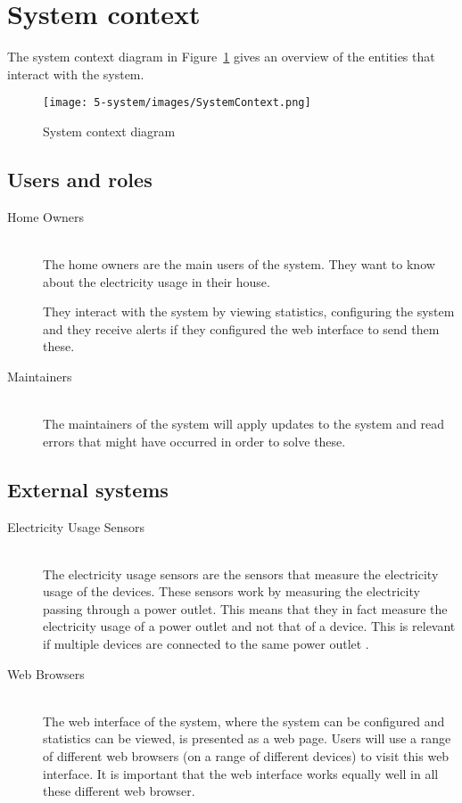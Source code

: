 \section{System context}
\label{sec:system-context}

The system context diagram in Figure~\ref{fig:system-context-diagram} gives an overview of the entities that interact with the system.

\begin{figure}[H]
	\centering
	\texttt{[image: 5-system/images/SystemContext.png]}
	\caption{System context diagram}
	\label{fig:system-context-diagram}
\end{figure}

\subsection{Users and roles}
\begin{description}

	\item[Home Owners] ~\\ The home owners are the main users of the system. They want to know about the electricity usage in their house. 
	
	They interact with the system by viewing statistics, configuring the system and they receive alerts if they configured the web interface to send them these. 
	
	\item[Maintainers] ~\\ The maintainers of the system will apply updates to the system and read errors that might have occurred in order to solve these.
	
\end{description}

\subsection{External systems}
\begin{description}

	\item[Electricity Usage Sensors] ~\\ The electricity usage sensors are the sensors that measure the electricity usage of the devices. These sensors work by measuring the electricity passing through a power outlet. This means that they in fact measure the electricity usage of a power outlet and not that of a device. This is relevant if multiple devices are connected to the same power outlet .
	
	\item[Web Browsers] ~\\ The web interface of the system, where the system can be configured and statistics can be viewed, is presented as a web page. Users will use a range of different web browsers (on a range of different devices) to visit this web interface. It is important that the web interface works equally well in all these different web browser.
	
\end{description}
